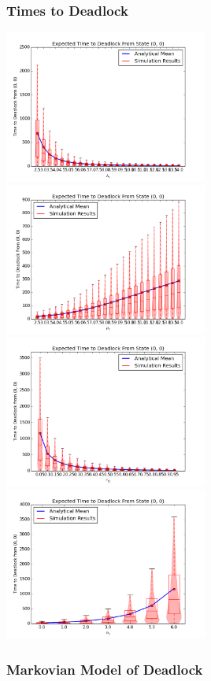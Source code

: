 \documentclass[xcolor={table}]{beamer}
\begin{document}
\begin{frame}
    \frametitle{Times to Deadlock}
    \includegraphics[width=0.5\textwidth]{varyL1}
    \includegraphics[width=0.5\textwidth]{varymu1}\newline
    \includegraphics[width=0.5\textwidth]{varyr12}
    \includegraphics[width=0.5\textwidth]{varyn1}
\end{frame}


\begin{frame}
    \frametitle{Markovian Model of Deadlock}
    \newline
\end{frame}
\end{document}
